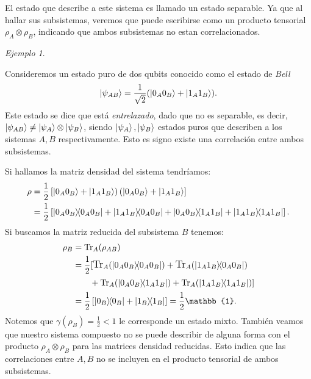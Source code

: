 \documentclass[letterpaper,12pt]{thesisECFM}
\theoremstyle{plain}
\theoremstyle{definition}
\theoremstyle{definition}
\theoremstyle{remark}
\newcommand{\1}{\mathbb{1}}
\newtheorem{ex}{Ejemplo}[section]
\begin{document}
El estado que describe a este sistema es llamado un estado separable. Ya que al hallar sus subsistemas, veremos que puede escribirse como un producto tensorial $\rho_A \otimes \rho_B$, indicando que ambos subsistemas no estan correlacionados.   

\begin{ex} \label{ex: traza parcial2} \end{ex} 
Consideremos un estado puro de dos qubits conocido como el estado de \textit{Bell} 
\begin{equation}
\label{ec:1.45}
    \ket{\psi_{AB}}=\frac{1}{\sqrt{2}} (\ket{0_A0_B} + \ket{1_A1_B}  ).
\end{equation}
Este estado se dice que está \textit{entrelazado}, dado que no es separable, es decir, $ \ket{\psi_{AB}} \neq \ket{\psi_A} \otimes \ket{\psi_B}$, siendo $\ket{\psi_A},\ket{\psi_B}$ estados puros que describen a los sistemas $A,B$ respectivamente. Esto es signo existe una correlación entre ambos subsistemas.

 Si hallamos la matriz densidad del sistema tendríamos:
\begin{align}
    \rho & =  \frac{1}{2}\left[ \ket{0_A0_B} + \ket{1_A1_B}        \right)\left( \ket{0_A0_B} + \ket{1_A1_B}        \right]\\
        & = \frac{1}{2} \left[ \ketbra{0_A0_B} + \ketbra{1_A1_B}{0_A0_B} + \ketbra{0_A0_B}{1_A1_B} + \ketbra{1_A1_B} \right].
\end{align}
Si buscamos la matriz reducida del subsistema $B$ tenemos:
\begin{align}
    \rho_B  & = \text{Tr}_A(\rho_{AB})\\
        & =  \frac{1}{2} \large[ \text{Tr}_A(\ketbra{0_A0_B}) + \text{Tr}_A(\ketbra{1_A1_B}{0_A0_B})\\
        & \qquad +\text{Tr}_A(\ketbra{0_A0_B}{1_A1_B}) + \text{Tr}_A(\ketbra{1_A1_B}{1_A1_B})  \large] \\
      & = \frac{1}{2} \left[ \ketbra{0_B} + \ketbra{1_B}  \right]  = \frac{1}{2} \mathbb{1}.
\end{align}
Notemos que $\gamma({\rho_B}) = \frac{1}{2} < 1$ le corresponde un estado mixto. También veamos que nuestro sistema compuesto no se puede describir de alguna forma con el producto $\rho_A \otimes \rho_B$ para las matrices densidad reducidas. Esto indica que las correlaciones entre $A,B$ no se incluyen en el producto tensorial de ambos subsistemas. 

\end{document}
